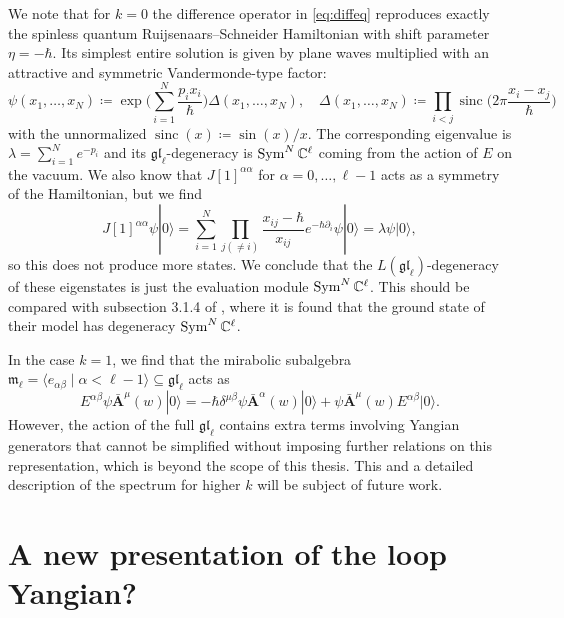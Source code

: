 We note that for $k=0$ the difference operator in \eqref{eq:diffeq} reproduces exactly the spinless quantum Ruijsenaars--Schneider Hamiltonian with shift parameter $\eta = -\hbar$. Its simplest entire solution is given by plane waves multiplied with an attractive and symmetric Vandermonde-type factor:
\begin{equation}
\psi(x_1,\dots,x_N) \coloneq \exp \bigg( \sum_{i=1}^N \frac{p_i x_i}{\hbar} \bigg) \Delta(x_1,\dots,x_N), \quad \Delta(x_1,\dots,x_N) \coloneq \prod_{i < j} \operatorname{sinc} \bigg( 2\pi \frac{x_i-x_j}{\hbar} \bigg)
\end{equation}
with the unnormalized $\operatorname{sinc}(x) \coloneq \sin(x)/x$.
The corresponding eigenvalue is $\lambda = \sum_{i=1}^N e^{-p_i}$ and its $\mathfrak{gl}_\ell$-degeneracy is $\operatorname{Sym}^N \mathbb{C}^\ell$ coming from the action of $E$ on the vacuum. We also know that $J[1]^{\alpha\alpha}$ for $\alpha = 0,\dots,\ell-1$ acts as a symmetry of the Hamiltonian, but we find
\begin{equation}
J[1]^{\alpha\alpha} \psi |0\rangle = \sum_{i=1}^N \prod_{j(\neq i)} \frac{x_{ij}-\hbar}{x_{ij}} e^{-\hbar\partial_i} \psi |0\rangle = \lambda \psi |0\rangle,
\end{equation}
so this does not produce more states. We conclude that the $L(\mathfrak{gl}_\ell)$-degeneracy of these eigenstates is just the evaluation module $\operatorname{Sym}^N \mathbb{C}^\ell$. This should be compared with subsection 3.1.4 of \cite{lamers_spin-ruijsenaars_2022}, where it is found that the ground state of their model has degeneracy $\operatorname{Sym}^N \mathbb{C}^\ell$.

In the case $k=1$, we find that the mirabolic subalgebra $\mathfrak{m_\ell} = \langle e_{\alpha\beta} \mid \alpha < \ell-1 \rangle \subseteq \mathfrak{gl}_\ell$ acts as
\begin{equation}
E^{\alpha\beta} \psi \bar{\mathbf{A}}^\mu(w) |0\rangle
= -\hbar \delta^{\mu\beta} \psi \bar{\mathbf{A}}^{\alpha}(w) |0\rangle + \psi \bar{\mathbf{A}}^\mu(w) E^{\alpha\beta} |0\rangle.
\end{equation}
However, the action of the full $\mathfrak{gl}_\ell$ contains extra terms involving Yangian generators that cannot be simplified without imposing further relations on this representation, which is beyond the scope of this thesis. This and a detailed description of the spectrum for higher $k$ will be subject of future work.

\section{A new presentation of the loop Yangian?}

